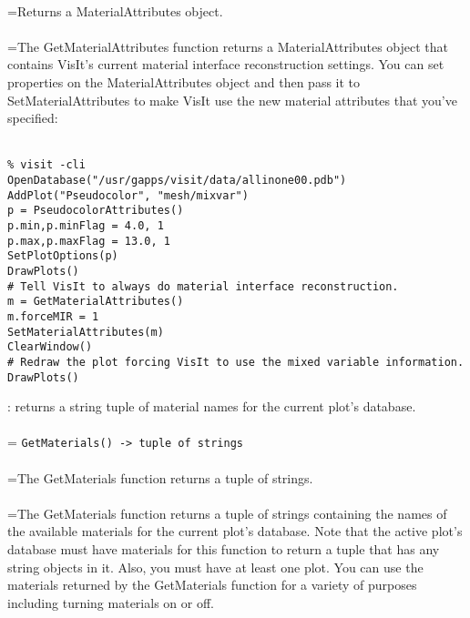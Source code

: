 \documentclass[10pt,a4paper]{report}
\begin{document}
 \\ 
\hangindent=\parindent Returns a MaterialAttributes object. \\[-3mm] 

 \\ 
\hangindent=\parindent The GetMaterialAttributes function returns a MaterialAttributes object that contains VisIt's current material interface reconstruction settings. You can set properties on the MaterialAttributes object and then pass it to SetMaterialAttributes to make VisIt use the new material attributes that you've specified: \\[-3mm] 

\\[-6mm]
\begin{verbatim}% visit -cli
OpenDatabase("/usr/gapps/visit/data/allinone00.pdb")
AddPlot("Pseudocolor", "mesh/mixvar")
p = PseudocolorAttributes()
p.min,p.minFlag = 4.0, 1
p.max,p.maxFlag = 13.0, 1
SetPlotOptions(p)
DrawPlots()
# Tell VisIt to always do material interface reconstruction.
m = GetMaterialAttributes()
m.forceMIR = 1
SetMaterialAttributes(m)
ClearWindow()
# Redraw the plot forcing VisIt to use the mixed variable information.
DrawPlots()
\end{verbatim}
\newpage


{}
: returns a string tuple of material names for the current plot's database.\\[-3mm]

 \\ 
\hangindent=\parindent 
\verb!GetMaterials() -> tuple of strings!\\ [-3mm]

 \\ 
\hangindent=\parindent The GetMaterials function returns a tuple of strings. \\[-3mm] 

 \\ 
\hangindent=\parindent The GetMaterials function returns a tuple of strings containing the names of the available materials for the current plot's database. Note that the active plot's database must have materials for this function to return a tuple that has any string objects in it. Also, you must have at least one plot. You can use the materials returned by the GetMaterials function for a variety of purposes including turning materials on or off. \\[-3mm] 
\end{document}
